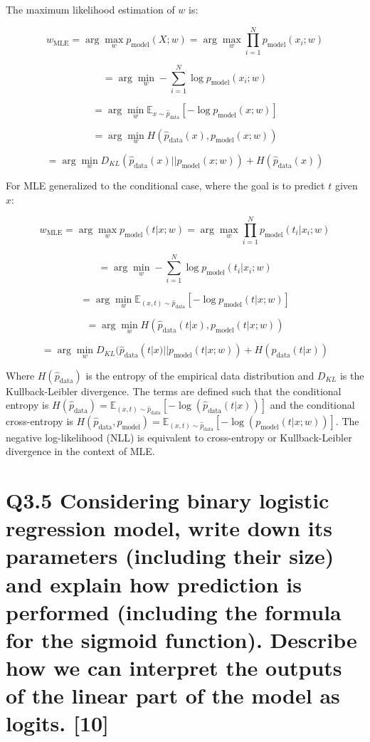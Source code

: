\documentclass[11pt]{article}
\begin{document}
The maximum likelihood estimation of \( w \) is:

\[
w_{\text{MLE}} = \arg \max_w p_{\text{model}}(X; w) = \arg \max_w \prod_{i=1}^{N} p_{\text{model}}(x_i; w)
\]

\[
= \arg \min_w -\sum_{i=1}^{N} \log p_{\text{model}}(x_i; w)
\]

\[
= \arg \min_w \mathbb{E}_{x \sim \hat{p}_{\text{data}}}[- \log p_{\text{model}}(x; w)]
\]

\[
= \arg \min_w H(\hat{p}_{\text{data}}(x), p_{\text{model}}(x; w))
\]

\[
= \arg \min_w D_{KL}(\hat{p}_{\text{data}}(x) || p_{\text{model}}(x; w)) + H(\hat{p}_{\text{data}}(x))
\]

For MLE generalized to the conditional case, where the goal is to predict \( t \) given \( x \):

\[
w_{\text{MLE}} = \arg \max_w p_{\text{model}}(t | x; w) = \arg \max_w \prod_{i=1}^{N} p_{\text{model}}(t_i | x_i; w)
\]

\[
= \arg \min_w -\sum_{i=1}^{N} \log p_{\text{model}}(t_i | x_i; w)
\]

\[
= \arg \min_w \mathbb{E}_{(x,t) \sim \hat{p}_{\text{data}}}[- \log p_{\text{model}}(t | x; w)]
\]

\[
= \arg \min_w H(\hat{p}_{\text{data}}(t | x), p_{\text{model}}(t | x; w))
\]

\[
= \arg \min_w D_{KL}(\hat{p}_{\text{data}}(t | x) || p_{\text{model}}(t | x; w)) + H(\hat{p}_{\text{data}}(t | x))
\]

Where \( H(\hat{p}_{\text{data}}) \) is the entropy of the empirical data distribution and \( D_{KL} \) is the Kullback-Leibler divergence. The terms are defined such that the conditional entropy is \( H(\hat{p}_{\text{data}}) = \mathbb{E}_{(x,t) \sim \hat{p}_{\text{data}}}[-\log(\hat{p}_{\text{data}}(t | x))] \) and the conditional cross-entropy is \( H(\hat{p}_{\text{data}}, p_{\text{model}}) = \mathbb{E}_{(x,t) \sim \hat{p}_{\text{data}}}[-\log(p_{\text{model}}(t | x; w))] \). The negative log-likelihood (NLL) is equivalent to cross-entropy or Kullback-Leibler divergence in the context of MLE.


\section{Q3.5 Considering binary logistic regression model, write down its parameters (including their size) and explain how prediction is performed (including the formula for the sigmoid function). Describe how we can interpret the outputs of the linear part of the model as logits. [10]}
\end{document}
